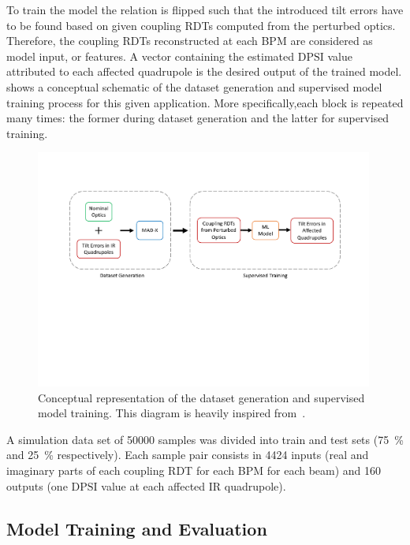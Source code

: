 To train the model the relation is flipped such that the introduced tilt errors have to be found based on given coupling RDTs computed from the perturbed optics.
Therefore, the coupling RDTs reconstructed at each BPM are considered as model input, or features.
A vector containing the estimated \(\mathrm{DPSI}\) value attributed to each affected quadrupole is the desired output of the trained model.
 shows a conceptual schematic of the dataset generation and supervised model training process for this given application.
More specifically,each block is repeated many times: the former during dataset generation and the latter for supervised training.

\begin{figure}[!htb]
    \centering
    \includegraphics*[width=0.99\textwidth]{Figures/ML_for_IR_Coupling/supervised_training_schematic.pdf}
    \caption{Conceptual representation of the dataset generation and supervised model training. This diagram is heavily inspired from~\cite{PHD:Fol:Application_ML_Beam_Optics}.}
    \label{figure:ml_supervised_training_schematic}
\end{figure}

A simulation data set of \num{50000} samples was divided into train and test sets (\qty{75}{\percent} and \qty{25}{\percent} respectively).
Each sample pair consists in \num{4424} inputs (real and imaginary parts of each coupling RDT for each BPM for each beam) and \num{160} outputs (one \(\mathrm{DPSI}\) value at each affected IR quadrupole).

\subsection{Model Training and Evaluation}

